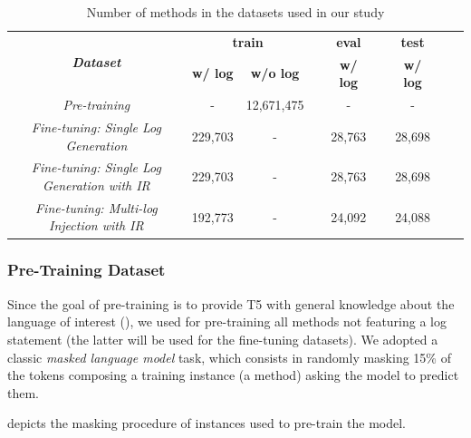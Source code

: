 \begin{table}[h]
	\centering
	\scriptsize
	\caption{Number of methods in the datasets used in our study\vspace{-0.3cm}}
		\label{tab:ds-summary-1}
	\begin{tabular}{ccccccccc}
		\toprule
		\multirow{2}{*}{\textit{\textbf{Dataset}}} & \multicolumn{2}{c}{\textbf{train}} & \textbf{} & \textbf{eval} & \textbf{} & \textbf{test}  \\ \cline{2-3} \cline{5-5} \cline{7-7} 
		& \textbf{w/ log} & \textbf{w/o log} & \textbf{} & \textbf{w/ log} & \textbf{} & \textbf{w/ log} \\ \midrule
		\textit{Pre-training}              & -               &      12,671,475  &           & -               &           &  -               \\
		\textit{Fine-tuning: Single Log Generation}               & 229,703         & -                &           & 28,763          &           & 28,698          \\
		\textit{Fine-tuning: Single Log Generation with IR}               & 229,703         & -                &           & 28,763          &           & 28,698          \\
		\textit{Fine-tuning: Multi-log Injection with IR}               & 192,773         & -                &           & 24,092         &           & 24,088          \\
		\bottomrule
	\end{tabular}
	\vspace{-0.3cm}
\end{table}

\subsubsection{Pre-Training Dataset}
\label{sub:pretraining}
Since the goal of pre-training is to provide T5 with general knowledge about the language of interest (\ie \java), we used for pre-training all methods not featuring a log statement (the latter will be used for the fine-tuning datasets). We adopted a classic \emph{masked language model} task, which consists in randomly masking 15\% of the tokens composing a training instance (\ie a \java method) asking the model to predict them. 


 depicts the masking procedure of instances used to pre-train the model.


